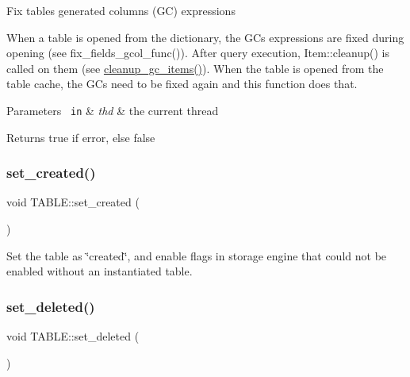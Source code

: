 Fix table\textquotesingle{}s generated columns\textquotesingle{} (GC) expressions

When a table is opened from the dictionary, the G\+Cs\textquotesingle{} expressions are fixed during opening (see fix\+\_\+fields\+\_\+gcol\+\_\+func()). After query execution, Item\+::cleanup() is called on them (see \mbox{\hyperlink{structTABLE_a909ba0f0bb359144360ba9ef643cb3de}{cleanup\+\_\+gc\+\_\+items()}}). When the table is opened from the table cache, the G\+Cs need to be fixed again and this function does that.


\begin{DoxyParams}[1]{Parameters}
\mbox{\texttt{ in}}  & {\em thd} & the current thread \\
\hline
\end{DoxyParams}
\begin{DoxyReturn}{Returns}
true if error, else false 
\end{DoxyReturn}
\mbox{\label{structTABLE_a2c88ea05c0c70fc854b9c809f797f89b}} 
\subsubsection{\texorpdfstring{set\+\_\+created()}{set\_created()}}
{\footnotesize\ttfamily void T\+A\+B\+L\+E\+::set\+\_\+created (\begin{DoxyParamCaption}{ }\end{DoxyParamCaption})\hspace{0.3cm}{\ttfamily [inline]}}

Set the table as \char`\"{}created\char`\"{}, and enable flags in storage engine that could not be enabled without an instantiated table. \mbox{\label{structTABLE_a2bac1524ecf90bda2145cfc92b16b040}} 
\subsubsection{\texorpdfstring{set\+\_\+deleted()}{set\_deleted()}}
{\footnotesize\ttfamily void T\+A\+B\+L\+E\+::set\+\_\+deleted (\begin{DoxyParamCaption}{ }\end{DoxyParamCaption})\hspace{0.3cm}{\ttfamily [inline]}}

